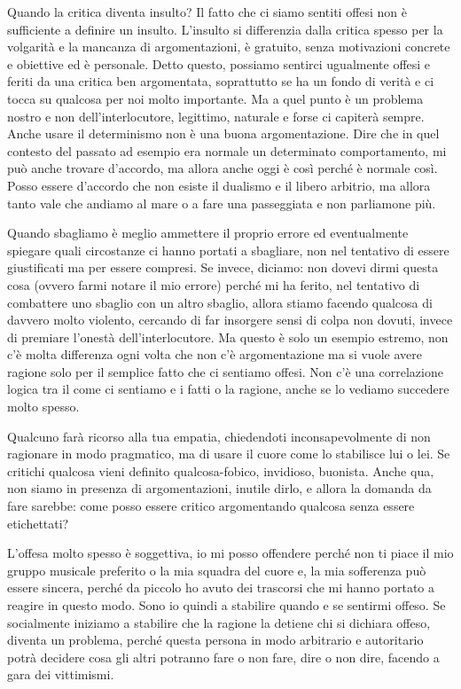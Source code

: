 \documentclass[12pt]{book} %
\begin{document}
Quando la critica diventa insulto? Il fatto che ci siamo sentiti offesi non è sufficiente a definire un insulto.
L'insulto si differenzia dalla critica spesso per la volgarità e la mancanza di argomentazioni, è
gratuito, senza motivazioni concrete e obiettive ed è personale. Detto questo, possiamo sentirci ugualmente offesi e feriti da una
critica ben argomentata, soprattutto se ha un fondo di verità e ci tocca su qualcosa per noi molto importante. Ma a quel
punto è un problema nostro e non dell'interlocutore, legittimo, naturale e forse ci capiterà sempre. 
Anche usare il determinismo non è una buona argomentazione. Dire che in quel contesto del passato ad esempio era normale un determinato comportamento, mi può anche trovare d'accordo, ma allora anche oggi è così perché è normale così. Posso essere d'accordo che non esiste il dualismo e il libero arbitrio, ma allora tanto vale che andiamo al mare o a fare una passeggiata e non parliamone più.

Quando sbagliamo è meglio ammettere il proprio errore ed eventualmente spiegare quali circostanze
ci hanno portati a sbagliare, non nel tentativo di essere giustificati ma per essere compresi. Se
invece, diciamo: non dovevi dirmi questa cosa (ovvero farmi notare il mio errore) perché
mi ha ferito, nel tentativo di combattere uno sbaglio con un altro sbaglio, allora stiamo facendo qualcosa di davvero
molto violento, cercando di far insorgere sensi di colpa non dovuti, invece di premiare l'onestà
dell'interlocutore. Ma questo è solo un esempio estremo, non c'è molta differenza ogni volta
che non c'è argomentazione ma si vuole avere ragione solo per il semplice fatto che ci sentiamo
offesi. Non c'è una correlazione logica tra il come ci sentiamo e i fatti o la ragione, anche se
lo vediamo succedere molto spesso.

Qualcuno farà ricorso alla tua empatia, chiedendoti inconsapevolmente di non ragionare in modo pragmatico, ma di usare il cuore come lo stabilisce lui o lei. Se critichi qualcosa vieni definito qualcosa-fobico, invidioso, buonista. Anche qua, non siamo in presenza di argomentazioni, inutile dirlo, e allora la domanda da fare sarebbe: come posso essere critico argomentando qualcosa senza essere etichettati?

L'offesa molto spesso è soggettiva, io mi posso offendere perché non ti piace il mio gruppo musicale preferito o la mia
squadra del cuore e, la mia sofferenza può essere sincera, perché da piccolo ho avuto dei trascorsi che mi hanno
portato a reagire in questo modo. Sono io quindi a stabilire quando e se sentirmi offeso. Se socialmente iniziamo a
stabilire che la ragione la detiene chi si dichiara offeso, diventa un problema, perché questa persona in modo
arbitrario e autoritario potrà decidere cosa gli altri potranno fare o non fare, dire o non dire, facendo a gara dei
vittimismi.
\end{document}

